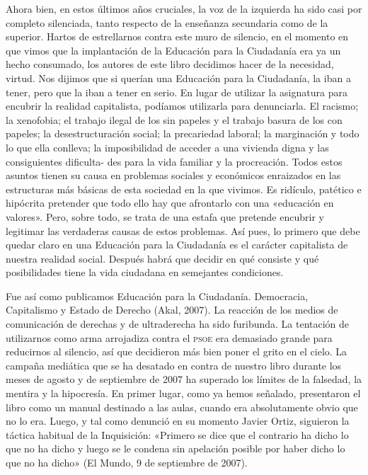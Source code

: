 \documentclass[draft,9pt,letterpaper,twocolumn,openany]{extbook}
\begin{document}
Ahora bien, en estos últimos años cruciales, la voz de la izquierda ha sido casi
por completo silenciada, tanto respecto de la enseñanza secundaria como de la
superior. Hartos de estrellarnos contra este muro de silencio, en el momento en
que vimos que la implantación de la Educación para la Ciudadanía era ya un hecho consumado, los autores de este libro decidimos hacer de la necesidad, virtud.
Nos dijimos que si querían una Educación para la Ciudadanía, la iban a tener, pero
que la iban a tener en serio. En lugar de utilizar la asignatura para encubrir la realidad capitalista, podíamos utilizarla para denunciarla. El racismo; la xenofobia; el
trabajo ilegal de los sin papeles y el trabajo basura de los con papeles; la desestructuración social; la precariedad laboral; la marginación y todo lo que ella conlleva; la imposibilidad de acceder a una vivienda digna y las consiguientes dificulta-
des para la vida familiar y la procreación. Todos estos asuntos tienen su causa en
problemas sociales y económicos enraizados en las estructuras más básicas de esta
sociedad en la que vivimos. Es ridículo, patético e hipócrita pretender que todo
ello hay que afrontarlo con una «educación en valores». Pero, sobre todo, se trata de una estafa que pretende encubrir y legitimar las verdaderas causas de estos
problemas. Así pues, lo primero que debe quedar claro en una Educación para
la Ciudadanía es el carácter capitalista de nuestra realidad social. Después habrá
que decidir en qué consiste y qué posibilidades tiene la vida ciudadana en semejantes condiciones.

Fue así como publicamos Educación para la Ciudadanía. Democracia, Capitalismo y Estado de Derecho (Akal, 2007). La reacción de los medios de comunicación
de derechas y de ultraderecha ha sido furibunda. La tentación de utilizarnos como
arma arrojadiza contra el \textsc{psoe} era demasiado grande para reducirnos al silencio,
así que decidieron más bien poner el grito en el cielo. La campaña mediática que se
ha desatado en contra de nuestro libro durante los meses de agosto y de septiembre de 2007 ha superado los límites de la falsedad, la mentira y la hipocresía. En
primer lugar, como ya hemos señalado, presentaron el libro como un manual destinado a las aulas, cuando era absolutamente obvio que no lo era. Luego, y tal como
denunció en su momento Javier Ortiz, siguieron la táctica habitual de la Inquisición:
«Primero se dice que el contrario ha dicho lo que no ha dicho y luego se le condena
sin apelación posible por haber dicho lo que no ha dicho» (El Mundo, 9 de septiembre de 2007).
\end{document}
